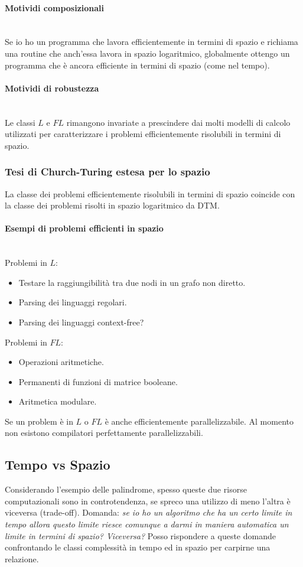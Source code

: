 \documentclass{article}
\begin{document}
\paragraph{Motividi composizionali}\mbox{}\\
Se io ho un programma che lavora efficientemente
in termini di spazio e richiama una routine che anch'essa lavora in spazio logaritmico, globalmente
ottengo un programma che è ancora efficiente in termini di spazio (come nel tempo).
\paragraph{Motividi di robustezza}\mbox{}\\
Le classi $L$ e $FL$ rimangono invariate a prescindere dai molti modelli
di calcolo utilizzati per caratterizzare i problemi efficientemente risolubili in termini di spazio.

\subsubsection{Tesi di Church-Turing estesa per lo spazio}
La classe dei problemi efficientemente risolubili in termini di spazio coincide con la classe dei problemi
risolti in spazio logaritmico da DTM.
\paragraph{Esempi di problemi efficienti in spazio}\mbox{}\\
Problemi in $L$:
\begin{itemize}
    \item Testare la raggiungibilità tra due nodi in un grafo non diretto.
    \item Parsing dei linguaggi regolari.
    \item Parsing dei linguaggi context-free?
\end{itemize}
Problemi in $FL$:
\begin{itemize}
    \item Operazioni aritmetiche.
    \item Permanenti di funzioni di matrice booleane.
    \item Aritmetica modulare.
\end{itemize}

Se un problem è in $L$ o $FL$ è anche efficientemente parallelizzabile. Al momento non esistono compilatori
perfettamente parallelizzabili.

\subsection{Tempo vs Spazio}
Considerando l'esempio delle palindrome, spesso queste due risorse computazionali sono in controtendenza,
se spreco una utilizzo di meno l'altra è viceversa (trade-off). Domanda: \textit{se io ho
    un algoritmo che ha un certo limite in tempo allora questo limite riesce comunque a darmi
    in maniera automatica un limite in termini di spazio? Viceversa?}
Posso rispondere a queste domande confrontando le classi complessità in tempo ed in spazio per
carpirne una relazione.
\end{document}
